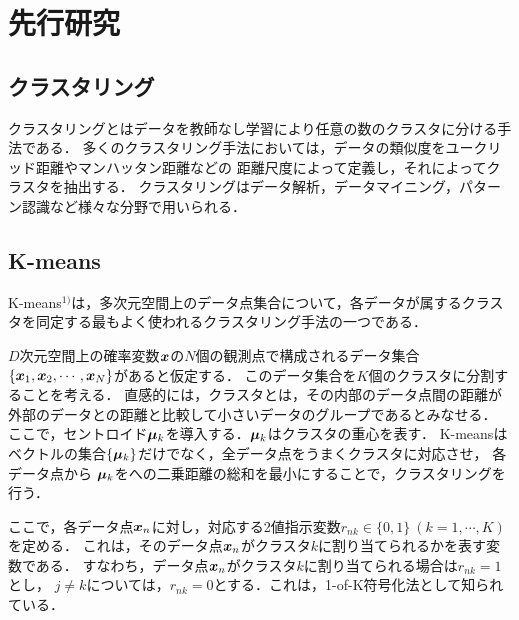 \section{先行研究}

\subsection{クラスタリング}
クラスタリングとはデータを教師なし学習により任意の数のクラスタに分ける手法である．
多くのクラスタリング手法においては，データの類似度をユークリッド距離やマンハッタン距離などの
距離尺度によって定義し，それによってクラスタを抽出する．
クラスタリングはデータ解析，データマイニング，パターン認識など様々な分野で用いられる．

\subsection{K-means}
K-means$^{1)}$は，多次元空間上のデータ点集合について，各データが属するクラスタを同定する最もよく使われるクラスタリング手法の一つである．

$D$次元空間上の確率変数$\boldsymbol{x}$の$N$個の観測点で構成されるデータ集合
$\{\boldsymbol{x}_1, \boldsymbol{x}_2, \cdots, \boldsymbol{x}_N\}$があると仮定する．
このデータ集合を$K$個のクラスタに分割することを考える．
直感的には，クラスタとは，その内部のデータ点間の距離が外部のデータとの距離と比較して小さいデータのグループであるとみなせる．
ここで，セントロイド$\boldsymbol{\mu}_k$を導入する．$\boldsymbol{\mu}_k$はクラスタの重心を表す．
K-meansはベクトルの集合$\{\boldsymbol{\mu}_k\}$だけでなく，全データ点をうまくクラスタに対応させ，
各データ点から $\boldsymbol{\mu}_k$をへの二乗距離の総和を最小にすることで，クラスタリングを行う．

ここで，各データ点$\boldsymbol{x}_n$に対し，対応する2値指示変数$r_{nk} \in \{0, 1\}\ (k = 1, \cdots, K)$を定める．
これは，そのデータ点$\boldsymbol{x}_n$がクラスタ$k$に割り当てられるかを表す変数である．
すなわち，データ点$\boldsymbol{x}_n$がクラスタ$k$に割り当てられる場合は$r_{nk}=1$とし，
$j \not= k$については，$r_{nk}=0$とする．これは，1-of-K符号化法として知られている．

